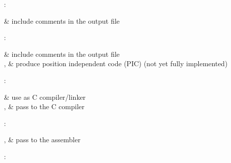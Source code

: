 :

\begin{CmdOptions}
 & include comments in the output file \\

\end{CmdOptions}

:

\begin{CmdOptions}
 & include comments in the output file \\
,  & produce position independent code (PIC) (not yet fully implemented) \\

\end{CmdOptions}

:

\begin{CmdOptions}
  & use  as C compiler/linker \\

 ,  & pass  to the C compiler \\

\end{CmdOptions}

:

\begin{CmdOptions}
 ,  & pass  to the assembler \\

\end{CmdOptions}

:

